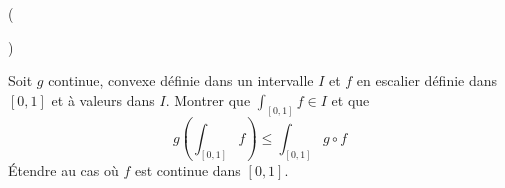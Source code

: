 \begin{tiny}()\end{tiny} Soit $g$ continue, convexe définie dans un intervalle $I$ et  $f$ en escalier définie dans $[0,1]$ et à valeurs dans $I$. Montrer que $\int_{[0,1]}f\in I$ et que
\begin{displaymath}
 g\left( \int_{[0,1]}f\right) \leq \int_{[0,1]}g\circ f 
\end{displaymath}
\'Etendre au cas où $f$ est continue dans $[0,1]$.

